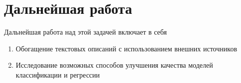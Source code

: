 \section{Дальнейшая работа}
\label{sec:further_work} 
Дальнейшая работа над этой задачей включает в себя
\begin{enumerate}
    \item Обогащение текстовых описаний с использованием внешних источников
    \item Исследование возможных способов улучшения качества моделей классификации и регрессии
\end{enumerate}
